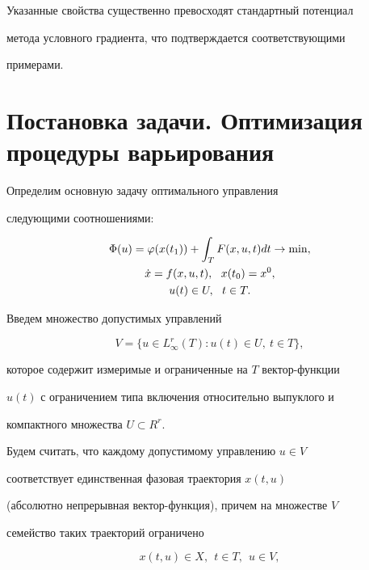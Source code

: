 Указанные свойства существенно превосходят стандартный потенциал


метода условного градиента, что подтверждается соответствующими


примерами.





\section{Постановка задачи. Оптимизация процедуры варьирования}





Определим основную задачу оптимального управления


следующими соотношениями:


\begin{gather}


\Phi(u)=\varphi(x(t_{1}))+\int_{T} F(x, u, t) dt \rightarrow \min,\notag\\


\Dot{x} = f(x, u, t),\ \ x(t_{0}) = x^{0},\\


u(t)\in U,\ \ t\in T.\notag


\end{gather}


Введем множество допустимых управлений


$$


V = \{u \in L_{\infty}^{r}(T) :u(t)\in U, \ t \in T \},


$$


которое содержит измеримые и ограниченные на $T$ вектор-функции


$u(t)$ с ограничением типа включения относительно выпуклого и


компактного множества $U \subset R^{r}$.





Будем считать, что каждому допустимому управлению $u \in V$


соответствует единственная фазовая траектория $x(t,u)$


(абсолютно непрерывная вектор-функция), причем на множестве $V$


семейство таких траекторий ограничено


$$


x(t,u) \in X,\ \ t \in T,\ \ u \in V,


$$


